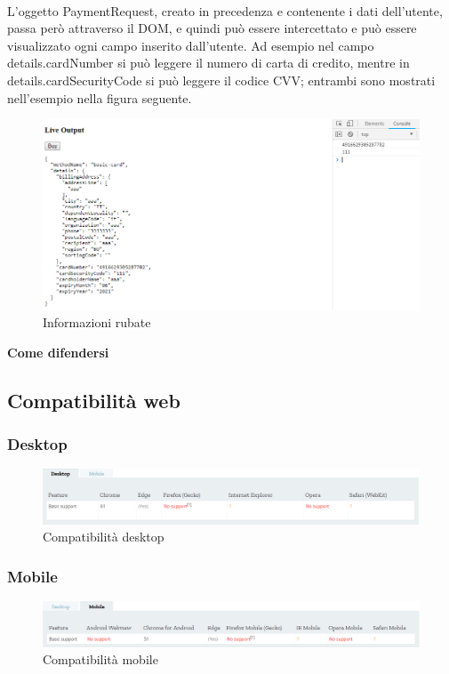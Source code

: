 \documentclass[11pt ,a4paper , twoside , openright ]{article}
\begin{document}
\\
\pagebreak
L'oggetto PaymentRequest, creato in precedenza e contenente i dati dell'utente, passa però attraverso il DOM, e quindi può essere intercettato e può essere visualizzato ogni campo inserito dall'utente. Ad esempio nel campo details.cardNumber si può leggere il numero di carta di credito, mentre in details.cardSecurityCode si può leggere il codice CVV; entrambi sono mostrati nell'esempio nella figura seguente.
\begin{figure}[h]
	\centering
	\includegraphics[width=1\linewidth]{Informazioni}
	\caption{Informazioni rubate}
	\label{fig: Informazioni rubate}
\end{figure}
\newpage

\textbf{Come difendersi}

\pagebreak


\subsection{Compatibilità web}
\subsubsection{Desktop}
\begin{figure}[h]
	\centering
	\includegraphics[width=1\linewidth]{Compatibilita1}
	\caption{Compatibilità desktop}
	\label{fig: Compatibilità desktop}
\end{figure}
\subsubsection{Mobile}
\begin{figure}[h]
	\centering
	\includegraphics[width=1\linewidth]{Compatibilita2}
	\caption{Compatibilità mobile}
	\label{fig: Compatibilità mobile}
\end{figure}
\end{document}
